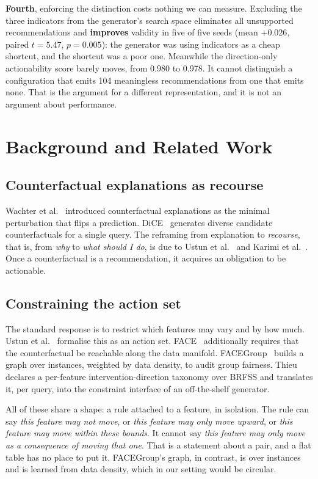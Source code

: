 \documentclass[conference]{IEEEtran}
\begin{document}
\textbf{Fourth}, enforcing the distinction costs nothing we can measure. Excluding the three indicators from the generator's search space eliminates all unsupported recommendations and \textbf{improves} validity in five of five seeds (mean $+0.026$, paired $t=5.47$, $p=0.005$): the generator was using indicators as a cheap shortcut, and the shortcut was a poor one. Meanwhile the direction-only actionability score barely moves, from 0.980 to 0.978. It cannot distinguish a configuration that emits 104 meaningless recommendations from one that emits none. That is the argument for a different representation, and it is not an argument about performance.

\section{Background and Related Work}
\subsection{Counterfactual explanations as recourse}
Wachter et al.~\cite{wachter2017} introduced counterfactual explanations as the minimal perturbation that flips a prediction. DiCE~\cite{mothilal2020} generates diverse candidate counterfactuals for a single query. The reframing from explanation to \emph{recourse}, that is, from \emph{why} to \emph{what should I do}, is due to Ustun et al.~\cite{ustun2019} and Karimi et al.~\cite{karimi2021}. Once a counterfactual is a recommendation, it acquires an obligation to be actionable.

\subsection{Constraining the action set}
The standard response is to restrict which features may vary and by how much. Ustun et al.~\cite{ustun2019} formalise this as an action set. FACE~\cite{poyiadzi2020} additionally requires that the counterfactual be reachable along the data manifold. FACEGroup~\cite{facegroup2025} builds a graph over instances, weighted by data density, to audit group fairness. Thieu~\cite{thieu2026} declares a per-feature intervention-direction taxonomy over BRFSS and translates it, per query, into the constraint interface of an off-the-shelf generator.

All of these share a shape: a rule attached to a feature, in isolation. The rule can say \emph{this feature may not move}, or \emph{this feature may only move upward}, or \emph{this feature may move within these bounds}. It cannot say \emph{this feature may only move as a consequence of moving that one}. That is a statement about a pair, and a flat table has no place to put it. FACEGroup's graph, in contrast, is over instances and is learned from data density, which in our setting would be circular.
\end{document}

